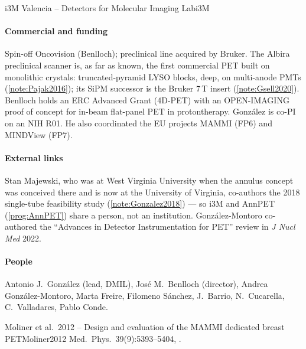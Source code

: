 \begin{programnote}{i3M Valencia -- Detectors for Molecular Imaging Lab}{i3M}
\paragraph{Commercial and funding}
Spin-off Oncovision (Benlloch); preclinical line acquired by Bruker. The
Albira preclinical scanner is, as far as known, the first commercial PET built on
monolithic crystals: truncated-pyramid
LYSO blocks,  deep, on multi-anode PMTs (\ref{note:Pajak2016}); its SiPM
successor is the Bruker 7\,T insert (\ref{note:Gsell2020}). 
Benlloch holds an ERC Advanced Grant (4D-PET) with an OPEN-IMAGING proof of
concept for in-beam flat-panel PET in protontherapy. González is co-PI on an NIH
R01. He also coordinated the EU projects MAMMI (FP6) and MINDView (FP7).
 
 
\paragraph{External links}
Stan Majewski, who was at West Virginia University when the annulus concept
was conceived there and is now at the University of Virginia, co-authors the
2018 single-tube feasibility study (\ref{note:Gonzalez2018}) --- so i3M and
AnnPET (\ref{prog:AnnPET}) share a person, not an institution.
González-Montoro co-authored the ``Advances in Detector Instrumentation for PET''
review in \emph{J Nucl Med} 2022.
 
\paragraph{People}
Antonio J.\ González (lead, DMIL), José M.\ Benlloch (director), Andrea
González-Montoro, Marta Freire, Filomeno Sánchez, J.\ Barrio, N.\ Cucarella,
C.\ Valladares, Pablo Conde.
 
 
\begin{papernote}{Moliner et al.\ 2012 -- Design and evaluation of the MAMMI dedicated breast PET}{Moliner2012}
Med.\ Phys.\ 39(9):5393--5404, .


\end{papernote}
\end{programnote}
